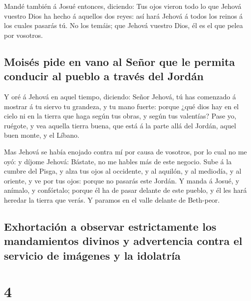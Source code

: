  Mandé también á Josué entonces, diciendo: Tus ojos
vieron todo lo que Jehová vuestro Dios ha hecho á aquellos dos reyes:
así hará Jehová á todos los reinos á los cuales pasarás tú.
 No los temáis; que Jehová vuestro Dios, él es el que
pelea por vosotros.

\hypertarget{moisuxe9s-pide-en-vano-al-seuxf1or-que-le-permita-conducir-al-pueblo-a-travuxe9s-del-jorduxe1n}{%
\subsection{Moisés pide en vano al Señor que le permita conducir al
pueblo a través del
Jordán}\label{moisuxe9s-pide-en-vano-al-seuxf1or-que-le-permita-conducir-al-pueblo-a-travuxe9s-del-jorduxe1n}}

 Y oré á Jehová en aquel tiempo, diciendo:
 Señor Jehová, tú has comenzado á mostrar á tu siervo tu
grandeza, y tu mano fuerte: porque ¿qué dios hay en el cielo ni en la
tierra que haga según tus obras, y según tus valentías? 
Pase yo, ruégote, y vea aquella tierra buena, que está á la parte allá
del Jordán, aquel buen monte, y el Líbano.

 Mas Jehová se había enojado contra mí por causa de
vosotros, por lo cual no me oyó: y díjome Jehová: Bástate, no me hables
más de este negocio.  Sube á la cumbre del Pisga, y alza
tus ojos al occidente, y al aquilón, y al mediodía, y al oriente, y ve
por tus ojos: porque no pasarás este Jordán.  Y manda á
Josué, y anímalo, y confórtalo; porque él ha de pasar delante de este
pueblo, y él les hará heredar la tierra que verás.  Y
paramos en el valle delante de Beth-peor.

\hypertarget{exhortaciuxf3n-a-observar-estrictamente-los-mandamientos-divinos-y-advertencia-contra-el-servicio-de-imuxe1genes-y-la-idolatruxeda}{%
\subsection{Exhortación a observar estrictamente los mandamientos
divinos y advertencia contra el servicio de imágenes y la
idolatría}\label{exhortaciuxf3n-a-observar-estrictamente-los-mandamientos-divinos-y-advertencia-contra-el-servicio-de-imuxe1genes-y-la-idolatruxeda}}

\hypertarget{section-3}{%
\section{4}\label{section-3}}

